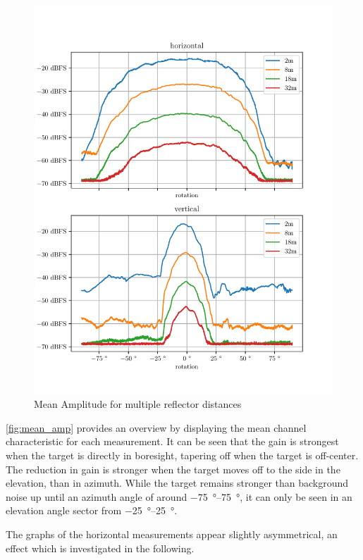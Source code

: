 \begin{figure}
    \centering
    \includegraphics[width=\textwidth]{../figures/mean_amp.pdf}
    \caption{Mean Amplitude for multiple reflector distances}
    \label{fig:mean_amp}
\end{figure}

\autoref{fig:mean_amp} provides an overview by displaying the mean channel characteristic for each measurement.
It can be seen that the gain is strongest when the target is directly in boresight,
tapering off when the target is off-center. The reduction in gain is stronger when the target
moves off to the side in the elevation, than in azimuth. While the target remains stronger
than background noise up until an azimuth angle of around \SIrange{-75}{+75}{\degree},
it can only be seen in an elevation angle sector from \SIrange{-25}{+25}{\degree}.

The graphs of the horizontal measurements appear slightly asymmetrical, an effect which is investigated in the following. \\

